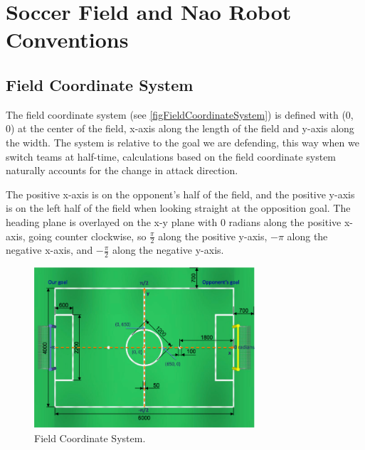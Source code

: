 \documentclass[pdftex,11pt,a4paper]{report}
\begin{document}
\appendix

\newpage
\chapter{Soccer Field and Nao Robot Conventions} \label{appendixNaoRobot} 
\section{Field Coordinate System} \label{appendixFCS}
The field coordinate system (see \autoref{figFieldCoordinateSystem}) is defined with (0, 0) at the center of the field, x-axis along the length of the field and y-axis along the width. The system is relative to the goal we are defending, this way when we switch teams at half-time, calculations based on the field coordinate system naturally accounts for the change in attack direction. 

The positive x-axis is on the opponent's half of the field, and the positive y-axis is on the left half of the field when looking straight at the opposition goal. The heading plane is overlayed on the x-y plane with 0 radians along the positive x-axis, going counter clockwise, so $\frac{\pi}{2}$ along the positive y-axis, $-\pi$ along the negative x-axis, and $-\frac{\pi}{2}$ along the negative y-axis.
\begin{figure} [ht]
  \centering
  \includegraphics[width=0.73\textwidth]{figures/FieldCoordinateSystem.png}
  \caption{Field Coordinate System.}\label{figFieldCoordinateSystem}
\end{figure}
\end{document}
